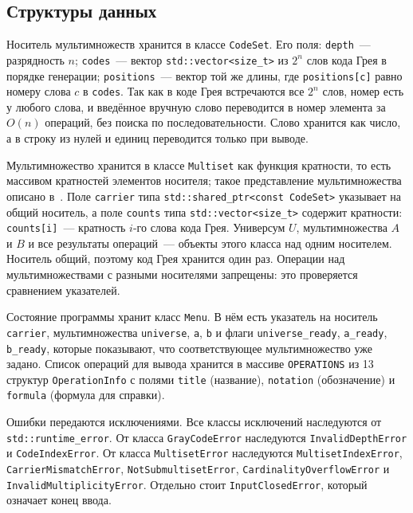 \documentclass[14pt,a4paper]{extarticle}
\newcommand{\code}[1]{\texttt{#1}}
\newcommand{\us}{\_\allowbreak{}}
\begin{document}
\subsection{Структуры данных}

Носитель мультимножеств хранится в классе \code{CodeSet}. Его поля: \code{depth}~--- разрядность $n$; \code{codes}~--- вектор \code{std::vector<size\us{}t>} из $2^n$ слов кода Грея в порядке генерации; \code{positions}~--- вектор той же длины, где \code{positions[c]} равно номеру слова $c$ в \code{codes}. Так как в коде Грея встречаются все $2^n$ слов, номер есть у любого слова, и введённое вручную слово переводится в номер элемента за $O(n)$ операций, без поиска по последовательности. Слово хранится как число, а в строку из нулей и единиц переводится только при выводе.

Мультимножество хранится в классе \code{Multiset} как функция кратности, то есть массивом кратностей элементов носителя; такое представление мультимножества описано в~\cite{novikov}. Поле \code{carrier} типа \code{std::shared\us{}ptr<const CodeSet>} указывает на общий носитель, а поле \code{counts} типа \code{std::vector<size\us{}t>} содержит кратности: \code{counts[i]}~--- кратность $i$-го слова кода Грея. Универсум $U$, мультимножества $A$ и $B$ и все результаты операций~--- объекты этого класса над одним носителем. Носитель общий, поэтому код Грея хранится один раз. Операции над мультимножествами с разными носителями запрещены: это проверяется сравнением указателей.

Состояние программы хранит класс \code{Menu}. В нём есть указатель на носитель \code{carrier}, мультимножества \code{universe}, \code{a}, \code{b} и флаги \code{universe\us{}ready}, \code{a\us{}ready}, \code{b\us{}ready}, которые показывают, что соответствующее мультимножество уже задано. Список операций для вывода хранится в массиве \code{OPERATIONS} из 13 структур \code{OperationInfo} с полями \code{title} (название), \code{notation} (обозначение) и \code{formula} (формула для справки).

Ошибки передаются исключениями. Все классы исключений наследуются от \code{std::runtime\us{}error}. От класса \code{GrayCodeError} наследуются \code{InvalidDepthError} и \code{CodeIndexError}. От класса \code{MultisetError} наследуются \code{MultisetIndexError}, \code{CarrierMismatchError}, \code{NotSubmultisetError}, \code{CardinalityOverflowError} и \code{InvalidMultiplicityError}. Отдельно стоит \code{InputClosedError}, который означает конец ввода.
\end{document}
